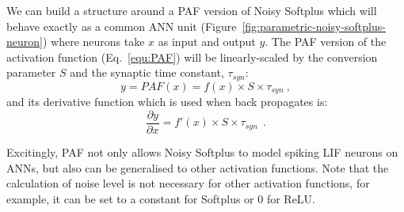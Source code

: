 \documentclass{article}
\begin{document}
We can build a structure around a PAF version of Noisy Softplus which will behave exactly as a common ANN unit (Figure~\ref{fig:parametric-noisy-softplus-neuron}) where neurons take $x$ as input and output $y$.
The PAF version of the activation function (Eq.~\ref{equ:PAF}) will be linearly-scaled by the conversion parameter $S$ and the synaptic time constant, $\tau_{syn}$:
\begin{equation}
y = PAF(x) = f(x) \times S \times \tau_{syn}~,
\label{equ:PAF}
\end{equation}
and its derivative function which is used when back propagates is:
\begin{equation}
\frac{\partial y}{\partial x} = f'(x) \times S \times \tau_{syn}~~.
\end{equation}

Excitingly, PAF not only allows Noisy Softplus to model spiking LIF neurons on ANNs, but also can be generalised to other activation functions.
Note that the calculation of noise level is not necessary for other activation functions, for example, it can be set to a constant for Softplus or 0 for ReLU.
%
%
%
%
\end{document}
